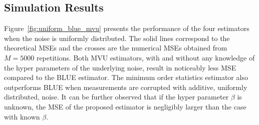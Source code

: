 \documentclass{article}
\begin{document}
%
%
%
%
%
%
%


\subsection{Simulation Results}
Figure~\ref{fig:uniform_blue_mvu} presents the performance of the four estimators when the noise is uniformly distributed. The solid lines correspond to the theoretical MSEs and the crosses are the numerical MSEs obtained from $M=5000$ repetitions. Both MVU estimators, with and without any knowledge of the hyper parameters of the underlying noise, result in noticeably less MSE compared to the BLUE estimator. The minimum order statistics estimator also outperforms BLUE when measurements are corrupted with additive, uniformly distributed, noise. It can be further observed that if the hyper parameter $\beta$ is unknown, the MSE of the proposed estimator is negligibly larger than the case with known $\beta$. 
\end{document}
